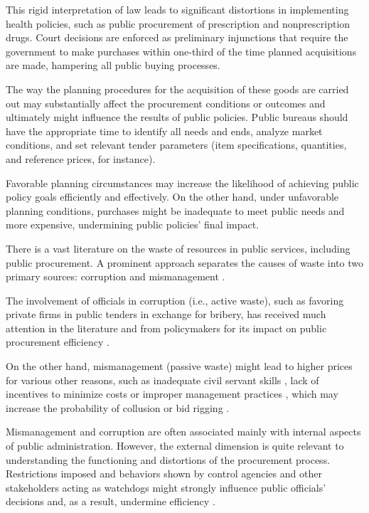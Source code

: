 This rigid interpretation of law leads to significant distortions in implementing health policies, such as public procurement of prescription and nonprescription drugs. Court decisions are enforced as preliminary injunctions that require the government to make purchases within one-third of the time planned acquisitions are made, hampering all public buying processes.

The way the planning procedures for the acquisition of these goods are carried out may substantially affect the procurement conditions or outcomes and ultimately might influence the results of public policies. Public bureaus should have the appropriate time to identify all needs and ends, analyze market conditions, and set relevant tender parameters (item specifications, quantities, and reference prices, for instance).

Favorable planning circumstances may increase the likelihood of achieving public policy goals efficiently and effectively. On the other hand, under unfavorable planning conditions, purchases might be inadequate to meet public needs and more expensive, undermining public policies’ final impact.

There is a vast literature on the waste of resources in public services, including public procurement. A prominent approach separates the causes of waste into two primary sources: corruption and mismanagement \citep{bandiera2009active}.

The involvement of officials in corruption (i.e., active waste), such as favoring private firms in public tenders in exchange for bribery, has received much attention in the literature and from policymakers for its impact on public procurement efficiency \citep{mironov2016corruption, basheka2011economic}.

On the other hand, mismanagement (passive waste) might lead to higher prices for various other reasons, such as inadequate civil servant skills \citep{best2017individuals}, lack of incentives to minimize costs \citep{cullen2016performance, ashraf2016dogooders, bandiera2017motivating} or improper management practices \citep{williams2018management, bloom2015impact, kvasnicka2015auctions, lewisfaupel2016can, rasul2018management}, which may increase the probability of collusion or bid rigging \citep{clark2018bid, moore2012cartels}.

Mismanagement and corruption are often associated mainly with internal aspects of public administration. However, the external dimension is quite relevant to understanding the functioning and distortions of the procurement process. Restrictions imposed and behaviors shown by control agencies and other stakeholders acting as watchdogs might strongly influence public officials’ decisions and, as a result, undermine efficiency \citep{brewer2010impact}.

